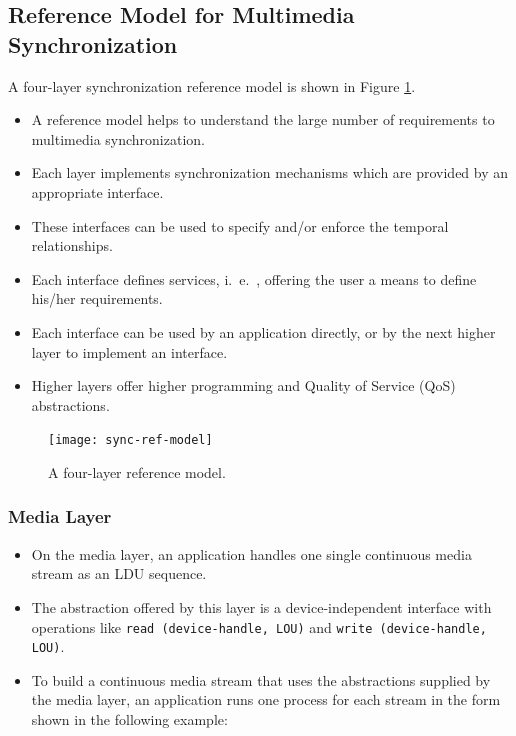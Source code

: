 \subsection{Reference Model for Multimedia Synchronization}
A four-layer synchronization reference model is shown in Figure \ref{fig:sync-ref-model}.
\begin{multicols}{2}
	\begin{itemize}
		\item A reference model helps to understand the large number of requirements to multimedia synchronization. 
		\item Each layer implements synchronization mechanisms which are provided by an appropriate interface.
		\item These interfaces can be used to specify and/or enforce the temporal relationships.
		\item Each interface defines services, i.\ e.\ , offering the user a means to define his/her requirements. 
		\item Each interface can be used by an application directly, or by the next	higher layer to implement an interface.
		\item Higher layers offer higher programming and Quality of Service (QoS) abstractions.
	\end{itemize}
\end{multicols}


\begin{figure}[ht!]
	\centering
	\texttt{[image: sync-ref-model]}
	\caption{A four-layer reference model.}\label{fig:sync-ref-model}
\end{figure}


\subsubsection{Media Layer}
\begin{multicols}{2}
	\begin{itemize}
		\item On the media layer, an application handles one single continuous media stream as an LDU sequence. 
		\item The abstraction offered by this layer is a device-independent interface with operations like  \lstinline|read (device-handle, LOU)| and \lstinline|write (device-handle, LOU)|.
		\item To build a continuous media stream that uses the abstractions supplied by the	media layer, an application runs one process for each stream in the form shown in the
		following example:
	\end{itemize}
\end{multicols}

